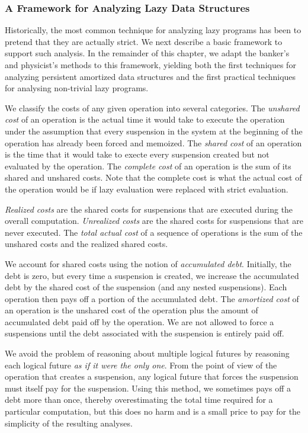 \documentclass[12pt, a4paper]{article} %
\begin{document}
\subsubsection{A Framework for Analyzing Lazy Data Structures}%
\label{ssub:A Framework for Analyzing Lazy Data Structures}

Historically, the most common technique for analyzing lazy programs has been to pretend that they are actually strict. We next describe a basic framework to support such analysis. In the remainder of this chapter, we adapt the banker's and physicist's methods to this framework, yielding both the first techniques for analyzing persistent amortized data structures and the first practical techniques for analysing non-trivial lazy programs.


We classify the costs of any given operation into several categories. The \textit{unshared cost} of an operation is the actual time it would take to execute the operation under the assumption that every suspension in the system at the beginning of the operation has already been forced and memoized. The \textit{shared cost} of an operation is the time that it would take to execte every suspension created but not evaluated by the operation. The \textit{complete cost} of an operation is the sum of its shared and unshared costs. Note that the complete cost is what the actual cost of the operation would be if lazy evaluation were replaced with strict evaluation.

\textit{Realized costs} are the shared costs for suspensions that are executed during the overall computation.
\textit{Unrealized costs} are the shared costs for suspensions that are never executed.
The \textit{total actual cost} of a sequence of operations is the sum of the unshared costs and the realized shared costs.

We account for shared costs using the notion of \textit{accumulated debt}. Initially, the debt is zero, but every time a suspension is created, we increase the accumulated debt by the shared cost of the suspension (and any nested suspensions). Each operation then pays off a portion of the accumulated debt. The \textit{amortized cost} of an operation is the unshared cost of the operation plus the amount of accumulated debt paid off by the operation. We are not allowed to force a suspensions until the debt associated with the suspension is entirely paid off.

We avoid the problem of reasoning about multiple logical futures by reasoning each logical future \textit{as if it were the only one}. From the point of view of the operation that creates a suspension, any logical future that forces the suspension must itself pay for the suspension. Using this method, we sometimes pays off a debt more than once, thereby overestimating the total time required for a particular computation, but this does no harm and is a small price to pay for the simplicity of the resulting analyses.
\end{document}
